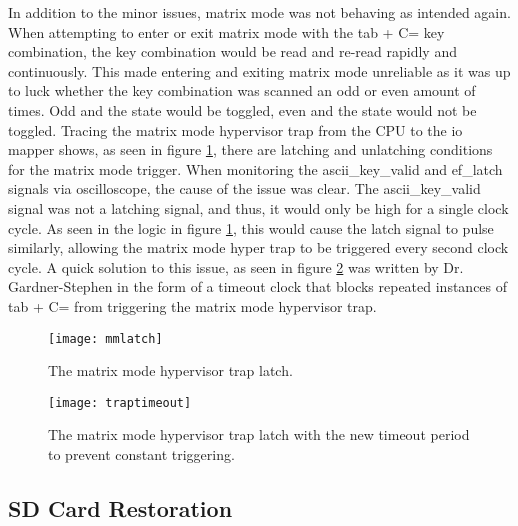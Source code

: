 In addition to the minor issues, matrix mode was not behaving as intended again. When attempting to enter or exit matrix mode with the tab + C= key combination, the key combination would be read and re-read rapidly and continuously. This made entering and exiting matrix mode unreliable as it was up to luck whether the key combination was scanned an odd or even amount of times. Odd and the state would be toggled, even and the state would not be toggled. Tracing the matrix mode hypervisor trap from the CPU to the io mapper shows, as seen in figure \ref{fig:mmlatch}, there are latching and unlatching conditions for the matrix mode trigger. When monitoring the ascii\_key\_valid and ef\_latch signals via oscilloscope, the cause of the issue was clear. The ascii\_key\_valid signal was not a latching signal, and thus, it would only be high for a single clock cycle. As seen in the logic in figure \ref{fig:mmlatch}, this would cause the latch signal to pulse similarly, allowing the matrix mode hyper trap to be triggered every second clock cycle. A quick solution to this issue, as seen in figure \ref{fig:traptimeout} was written by Dr. Gardner-Stephen in the form of a timeout clock that blocks repeated instances of tab + C= from triggering the matrix mode hypervisor trap.

\begin{figure}
  \centering
  \texttt{[image: mmlatch]}
  \caption{The matrix mode hypervisor trap latch.}
  \label{fig:mmlatch}
\end{figure}

\begin{figure}
  \centering
  \texttt{[image: traptimeout]}
  \caption{The matrix mode hypervisor trap latch with the new timeout period to prevent constant triggering.}
  \label{fig:traptimeout}
\end{figure}

\subsection{SD Card Restoration}

\label{Ch6 Sec2 Sub2}


